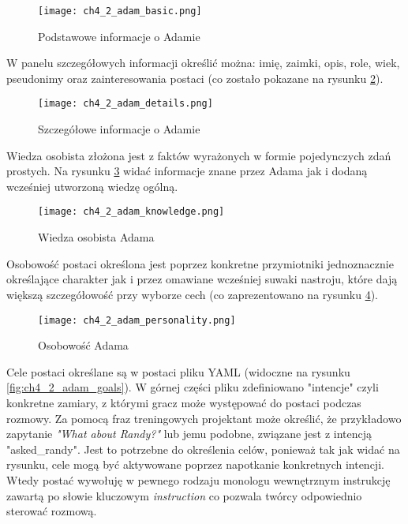 \begin{figure}[h!]
    \centering
    \texttt{[image: ch4\_2\_adam\_basic.png]}
    \caption{Podstawowe informacje o Adamie}
    \label{fig:ch4_2_adam_basic}
\end{figure}

\newpage

W panelu szczegółowych informacji określić można: imię, zaimki, opis, role, wiek, pseudonimy oraz
zainteresowania postaci (co zostało pokazane na rysunku \ref{fig:ch4_2_adam_details}).

\begin{figure}[h!]
    \centering
    \texttt{[image: ch4\_2\_adam\_details.png]}
    \caption{Szczegółowe informacje o Adamie}
    \label{fig:ch4_2_adam_details}
\end{figure}

\newpage

Wiedza osobista złożona jest z faktów wyrażonych w formie pojedynczych zdań prostych. Na rysunku
\ref{fig:ch4_2_adam_knowledge} widać informacje znane przez Adama jak i dodaną wcześniej utworzoną
wiedzę ogólną.

\begin{figure}[h!]
    \centering
    \texttt{[image: ch4\_2\_adam\_knowledge.png]}
    \caption{Wiedza osobista Adama}
    \label{fig:ch4_2_adam_knowledge}
\end{figure}

Osobowość postaci określona jest poprzez konkretne przymiotniki jednoznacznie określające charakter jak i
przez omawiane wcześniej suwaki nastroju, które dają większą szczegółowość przy wyborze cech (co
zaprezentowano na rysunku \ref{fig:ch4_2_adam_personality}).

\begin{figure}[h!]
    \centering
    \texttt{[image: ch4\_2\_adam\_personality.png]}
    \caption{Osobowość Adama}
    \label{fig:ch4_2_adam_personality}
\end{figure}

\newpage

Cele postaci określane są w postaci pliku YAML (widoczne na rysunku \ref{fig:ch4_2_adam_goals}). W górnej
części pliku zdefiniowano "intencje" czyli konkretne zamiary, z którymi gracz może występować do postaci
podczas rozmowy. Za pomocą fraz treningowych projektant może określić, że przykładowo zapytanie
\textit{"What about Randy?"} lub jemu podobne, związane jest z intencją "asked\_randy". Jest to potrzebne
do określenia celów, ponieważ tak jak widać na rysunku, cele mogą być aktywowane poprzez napotkanie
konkretnych intencji. Wtedy postać wywołuję w pewnego rodzaju monologu wewnętrznym instrukcję zawartą
po słowie kluczowym \textit{instruction} co pozwala twórcy odpowiednio sterować rozmową.

